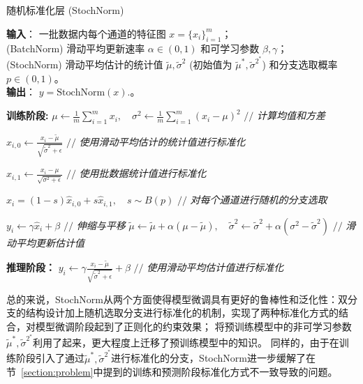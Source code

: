 \begin{algorithm}[htbp]
  \caption{随机标准化层 (StochNorm)}
  \label{alg:main}
  \begin{algorithmic}
      \STATE \hspace{-11pt} {\bfseries 输入}： 一批数据内每个通道的特征图 $x=\{x_{i}\}_{i=1}^{m}$；\\
      (BatchNorm) 滑动平均更新速率 $\alpha \in (0,1)$ 和可学习参数 $\beta, \gamma$；\\
      (StochNorm) 滑动平均估计的统计值 $\tilde{\mu}, \tilde{\sigma}^2$ (初始值为 $\tilde{\mu}^*, \tilde{\sigma}^{2^*}$) 和分支选取概率 $p \in (0,1)$。 \\
      \STATE \hspace{-11pt} {\bfseries 输出}： $y={\textrm{StochNorm}}(x)$.。
  
      \STATE \hspace{-11pt} \textbf{训练阶段:}
      \STATE $\displaystyle \mu \leftarrow \frac{1}{m}\sum_{i=1}^{m}x_{i}, \quad \sigma^2 \leftarrow \frac{1}{m}\sum_{i=1}^{m}(x_i-\mu)^2$ \hfill $//$ \textit{计算均值和方差}
  
      \STATE $\displaystyle \widehat{x}_{i,0} \leftarrow
      \frac{x_{i}-\tilde{\mu}}{\sqrt{\tilde{\sigma}^2+ \epsilon}}$
      \hfill $//$ \textit{使用滑动平均估计的统计值进行标准化}
      
      \STATE $\displaystyle \widehat{x}_{i,1} \leftarrow 
      \frac{x_{i}-\mu}{\sqrt{\sigma^2+\epsilon}}$
      \hfill $//$ \textit{使用批数据统计值进行标准化}

      \STATE $\widehat{x}_{i}=(1-s)\widehat{x}_{i,0}+s\widehat{x}_{i,1}, \quad s \sim B(p)$
      \hfill $//$ \textit{对每个通道进行随机的分支选取}
      
      \STATE $y_{i} \leftarrow \gamma \widehat{x}_{i} +\beta$
      \hfill $//$ \textit{伸缩与平移}
      \STATE $\tilde{\mu} \leftarrow \tilde{\mu} + \alpha (\mu-\tilde{\mu}), \quad \tilde{\sigma}^2 \leftarrow \tilde{\sigma}^2 + \alpha (\sigma^2-\tilde{\sigma}^2)$ 
      \hfill $//$ \textit{滑动平均更新估计值}
      
      \STATE \hspace{-11pt} {\bfseries 推理阶段：}
      \STATE $\displaystyle y_{i} \leftarrow \gamma \frac{x_{i}-\tilde{\mu}}{\sqrt{\tilde{\sigma}^2 + \epsilon}} + \beta$ \hfill $//$ \textit{使用滑动平均估计值进行标准化}
  \end{algorithmic}
\end{algorithm}

总的来说，StochNorm从两个方面使得模型微调具有更好的鲁棒性和泛化性：双分支的结构设计加上随机选取分支进行标准化的机制，实现了两种标准化方式的结合，对模型微调阶段起到了正则化的约束效果；
将预训练模型中的非可学习参数$\tilde{\mu}^*, \tilde{\sigma}^{2^*}$利用了起来，更大程度上迁移了预训练模型中的知识。
同样的，由于在训练阶段引入了通过$\tilde{\mu}^*, \tilde{\sigma}^{2^*}$进行标准化的分支，StochNorm进一步缓解了在节~\ref{section:problem}中提到的训练和预测阶段标准化方式不一致导致的问题。 


